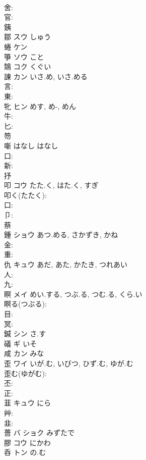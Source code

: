 \documentclass[8pt]{extreport}
\begin{document}
\begin{CJK}{UTF8}{min}
\\	舍: 
\\	官: 
\\	銕						
\\	鄒	スウ しゅう			
\\	蜷	ケン			
\\	箏	ソウ こと			
\\	鵠	コク くぐい			
\\	諌	カン	いさ.め, いさ.める		
\\	言: 
\\	東: 
\\	牝	ヒン	めす, め-, めん		
\\	牛: 
\\	匕: 
\\	笏						
\\	噺	はなし	はなし		
\\	口: 
\\	新: 
\\	抒						
\\	叩	コウ	たた.く, はた.く, すぎ		
\\	叩く(たたく): 
\\	口: 
\\	卩: 
\\	蔡						
\\	鍾	ショウ	あつ.める, さかずき, かね		
\\	金: 
\\	重: 
\\	仇	キュウ	あだ, あた, かたき, つれあい		
\\	人: 
\\	九: 
\\	瞑	メイ	めい.する, つぶ.る, つむ.る, くら.い		
\\	瞑る(つぶる): 
\\	目: 
\\	冥: 
\\	鍼	シン さ.す			
\\	礒	ギ いそ			
\\	咸	カン みな			
\\	歪	ワイ	いが.む, いびつ, ひず.む, ゆが.む		
\\	歪む(ゆがむ): 
\\	丕: 
\\	正: 
\\	韮	キュウ	にら		
\\	艸: 
\\	韭: 
\\	薔	バ ショク みずたで			
\\	膠	コウ にかわ			
\\	呑	トン	の.む		

\end{CJK}
\end{document}

